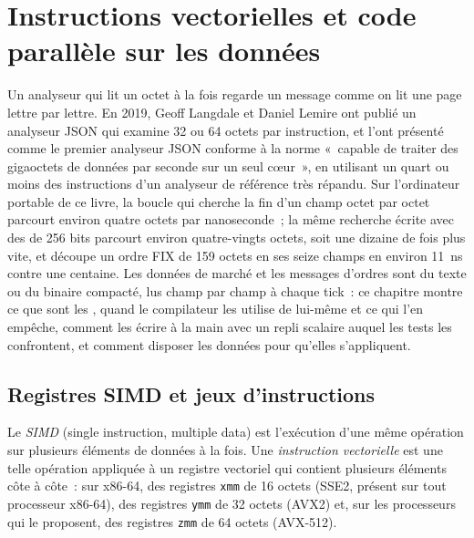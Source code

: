 \chapter{Instructions vectorielles et code parallèle sur les données}\label{ch:ll:vector-instructions-and-data-parallel-code}

Un analyseur qui lit un octet à la fois regarde un message comme on lit une page lettre par lettre. En 2019, Geoff
Langdale et Daniel Lemire ont publié un analyseur JSON qui examine 32 ou 64 octets par instruction, et l'ont présenté comme
le premier analyseur JSON conforme à la norme «~capable de traiter des gigaoctets de données par seconde sur un seul cœur~», en utilisant un quart
ou moins des instructions d'un analyseur de référence très répandu. Sur l'ordinateur portable de ce livre, la boucle qui cherche la fin
d'un champ octet par octet parcourt environ quatre octets par nanoseconde~; la même recherche écrite avec des  de 256 bits parcourt
environ quatre-vingts octets, soit une dizaine de fois plus vite, et découpe un ordre FIX de 159 octets en ses seize champs en environ \qty{11}{\nano\second}
contre une centaine. Les données de marché et les messages d'ordres sont du texte ou du binaire compacté, lus champ par champ à chaque tick~: ce
chapitre montre ce que sont les , quand le compilateur les utilise de lui-même et ce qui l'en empêche, comment les écrire à la main
avec un repli scalaire auquel les tests les confrontent, et comment disposer les données pour qu'elles s'appliquent.

\section{Registres SIMD et jeux d'instructions}

\begin{definition}\label{def:ll:vector-instructions-and-data-parallel-code:simd}
Le \emph{SIMD} (single instruction, multiple data) est l'exécution d'une même opération sur plusieurs éléments de données
à la fois. Une \emph{instruction vectorielle} est une telle opération appliquée à un registre vectoriel qui contient plusieurs
éléments côte à côte~: sur x86-64, des registres \texttt{xmm} de 16 octets (SSE2, présent sur tout processeur x86-64), des
registres \texttt{ymm} de 32 octets (AVX2) et, sur les processeurs qui le proposent, des registres \texttt{zmm} de 64 octets (AVX-512).
\end{definition}

